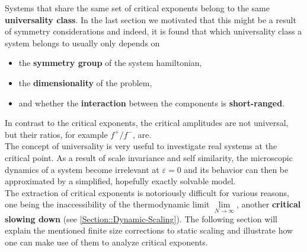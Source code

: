 	Systems that share the same set of critical exponents belong to the same \textbf{universality class}. In the last section we motivated that this might be a result of symmetry considerations and indeed, it is found that which universality class a system belongs to usually only depends on
	\begin{itemize}
		\item the \textbf{symmetry group} of the system hamiltonian,
		\item the \textbf{dimensionality} of the problem,
		\item and whether the \textbf{interaction} between the components is \textbf{short-ranged}.
	\end{itemize}
	In contrast to the critical exponents, the critical amplitudes are not universal, but their ratios, for example $f^+/f^-$, are.\\
	
	The concept of universality is very useful to investigate real systems at the critical point. As a result of scale invariance and self similarity, the microscopic dynamics of a system become irrelevant at $\varepsilon =	0$ and its behavior can then be approximated by a simplified, hopefully exactly solvable model. \\
	
	The extraction of critical exponents is notoriously difficult for various reasons, one being the inaccessibility of the thermodynamic limit $\lim\limits_{N \rightarrow \infty}$, another \textbf{critical slowing down} (see \autoref{Section::Dynamic-Scaling}). The following section will explain the mentioned finite size corrections to static scaling and illustrate how one can make use of them to analyze critical exponents.
